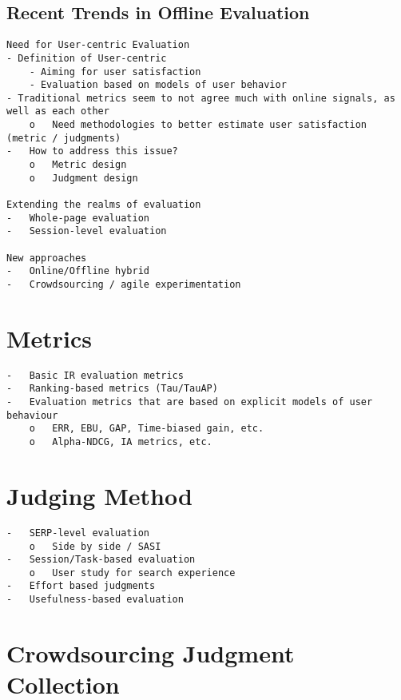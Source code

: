 \documentclass[openany]{now} %
\begin{document}
\cite{INR-009} \cite{borlund2003} \cite{cleverdon67}

\section{Recent Trends in Offline Evaluation}

\begin{verbatim}
Need for User-centric Evaluation
- Definition of User-centric
	- Aiming for user satisfaction
	- Evaluation based on models of user behavior
- Traditional metrics seem to not agree much with online signals, as well as each other
	o	Need methodologies to better estimate user satisfaction (metric / judgments)
-	How to address this issue?
	o	Metric design
	o	Judgment design

Extending the realms of evaluation
-	Whole-page evaluation
-	Session-level evaluation

New approaches
-	Online/Offline hybrid
-	Crowdsourcing / agile experimentation
\end{verbatim}

\chapter{Metrics}

\begin{verbatim}
-	Basic IR evaluation metrics 
-	Ranking-based metrics (Tau/TauAP)
-	Evaluation metrics that are based on explicit models of user behaviour
	o	ERR, EBU, GAP, Time-biased gain, etc.
	o	Alpha-NDCG, IA metrics, etc.
\end{verbatim}

\chapter{Judging Method}

\begin{verbatim}
-	SERP-level evaluation 
	o	Side by side / SASI
-	Session/Task-based evaluation
	o	User study for search experience
-	Effort based judgments
-	Usefulness-based evaluation
\end{verbatim}

\cite{Thomas2006}
\cite{Chandar2013} \cite{Al-Maskari2007} \cite{Bailey2010} \cite{CarteretteBCD08}

\chapter{Crowdsourcing Judgment Collection}
\end{document}
